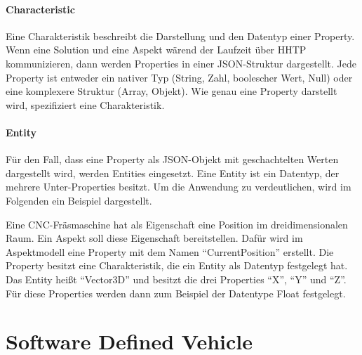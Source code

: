 \paragraph{Characteristic} Eine Charakteristik beschreibt die Darstellung und den Datentyp einer Property. Wenn eine Solution und eine Aspekt wärend der Laufzeit über HHTP kommunizieren, dann werden Properties in einer JSON-Struktur dargestellt. Jede Property ist entweder ein nativer Typ (String, Zahl, boolescher Wert, Null) oder eine komplexere Struktur (Array, Objekt). Wie genau eine Property darstellt wird, spezifiziert eine Charakteristik.

\paragraph{Entity} Für den Fall, dass eine Property als JSON-Objekt mit geschachtelten Werten dargestellt wird, werden Entities eingesetzt. Eine Entity ist ein Datentyp, der mehrere Unter-Properties besitzt. Um die Anwendung zu verdeutlichen, wird im Folgenden ein Beispiel dargestellt.

Eine CNC-Fräsmaschine hat als Eigenschaft eine Position im dreidimensionalen Raum. Ein Aspekt soll diese Eigenschaft bereitstellen. Dafür wird im Aspektmodell eine Property mit dem Namen "`CurrentPosition"' erstellt. Die Property besitzt eine Charakteristik, die ein Entity als Datentyp festgelegt hat. Das Entity heißt "`Vector3D"' und besitzt die drei Properties "`X"', "`Y"' und "`Z"'. Für diese Properties werden dann zum Beispiel der Datentype Float festgelegt.

\section{Software Defined Vehicle}

